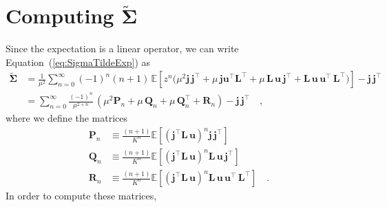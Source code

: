 \documentclass[modern]{aastex62}
\begin{document}
    \section{Computing $\tilde{\pmb{\Sigma}}$}
    Since the expectation is a linear operator, we can write Equation~(\ref{eq:SigmaTildeExp})
    as
    \begin{align}
        \tilde{\pmb{\Sigma}}
         & =
        \frac{1}{\mu^2}
        \sum\limits_{n=0}^\infty
        (-1)^n (n + 1)
        \,
        \mathbb{E}\left[
            z^n
            \Bigg(
            \mu^2 \mathbf{j} \, \mathbf{j}^\top
            +
            \mu \, \mathbf{j}\mathbf{u}^\top \mathbf{L}^\top
            +
            \mu \, \mathbf{L} \, \mathbf{u} \, \mathbf{j}^\top
            +
            \mathbf{L} \, \mathbf{u} \, \mathbf{u}^\top \, \mathbf{L}^\top
            \Bigg)
            \right]
        - \mathbf{j} \, \mathbf{j}^\top
        \nonumber \\[0.5em]
         & =
        \sum\limits_{n=0}^\infty
        \frac{(-1)^n}{\mu^{2 + n}}
        \,
        \left(
        \mu^2 \mathbf{P}_n
        +
        \mu \, \mathbf{Q}_n
        +
        \mu \, \mathbf{Q}_n^\top
        +
        \mathbf{R}_n
        \right)
        - \mathbf{j} \, \mathbf{j}^\top
        \quad,
    \end{align}
    where we define the matrices
    \begin{align}
        \mathbf{P}_n & \equiv \frac{(n + 1)}{K^n}\mathbb{E}\left[ \left(\mathbf{j}^\top \mathbf{L} \, \mathbf{u}\right)^n \mathbf{j} \, \mathbf{j}^\top \right]
        \nonumber                                                                                                                                                                                \\[0.5em]
        \mathbf{Q}_n & \equiv \frac{(n + 1)}{K^n}\mathbb{E}\left[ \left(\mathbf{j}^\top \mathbf{L} \, \mathbf{u}\right)^n \mathbf{L} \, \mathbf{u} \, \mathbf{j}^\top \right]
        \nonumber                                                                                                                                                                                \\[0.5em]
        \mathbf{R}_n & \equiv \frac{(n + 1)}{K^n}\mathbb{E}\left[ \left(\mathbf{j}^\top \mathbf{L} \, \mathbf{u}\right)^n \mathbf{L} \, \mathbf{u} \, \mathbf{u}^\top \, \mathbf{L}^\top \right]
        \quad.
    \end{align}
    In order to compute these matrices,
\end{document}
